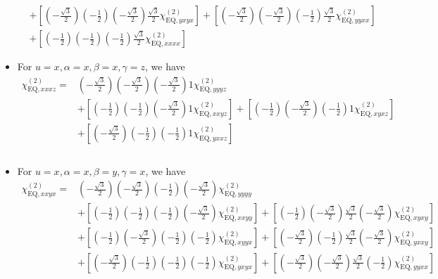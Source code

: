 \documentclass[UTF8,10pt,a4paper]{article}
\begin{document}
\begin{itemize}
\begin{align}
\nonumber&+\left[\left(-\frac{\sqrt{3}}{2}\right)\left(-\frac{1}{2}\right)\left(-\frac{\sqrt{3}}{2}\right)\frac{\sqrt{3}}{2}\chi_{\text{EQ},yxyx}^{(2)}\right]+\left[\left(-\frac{\sqrt{3}}{2}\right)\left(-\frac{\sqrt{3}}{2}\right)\left(-\frac{1}{2}\right)\frac{\sqrt{3}}{2}\chi_{\text{EQ},yyxx}^{(2)}\right]\\
&+\left[\left(-\frac{1}{2}\right)\left(-\frac{1}{2}\right)\left(-\frac{1}{2}\right)\frac{\sqrt{3}}{2}\chi_{\text{EQ},xxxx}^{(2)}\right]
\end{align}\normalsize
\item For $u=x,\alpha=x,\beta=x,\gamma=z$, we have
\footnotesize\begin{align}
\nonumber\chi_{\text{EQ},xxxz}^{(2)}=&\left(-\frac{\sqrt{3}}{2}\right)\left(-\frac{\sqrt{3}}{2}\right)\left(-\frac{\sqrt{3}}{2}\right)1\chi_{\text{EQ},yyyz}^{(2)}\\
\nonumber&+\left[\left(-\frac{1}{2}\right)\left(-\frac{1}{2}\right)\left(-\frac{\sqrt{3}}{2}\right)1\chi_{\text{EQ},xxyz}^{(2)}\right]+\left[\left(-\frac{1}{2}\right)\left(-\frac{\sqrt{3}}{2}\right)\left(-\frac{1}{2}\right)1\chi_{\text{EQ},xyxz}^{(2)}\right]\\
\nonumber&+\left[\left(-\frac{\sqrt{3}}{2}\right)\left(-\frac{1}{2}\right)\left(-\frac{1}{2}\right)1\chi_{\text{EQ},yxxz}^{(2)}\right]\\
\nonumber&\\
&
\end{align}\normalsize
\item For $u=x,\alpha=x,\beta=y,\gamma=x$, we have
\footnotesize\begin{align}
\nonumber\chi_{\text{EQ},xxyx}^{(2)}=&\left(-\frac{\sqrt{3}}{2}\right)\left(-\frac{\sqrt{3}}{2}\right)\left(-\frac{1}{2}\right)\left(-\frac{\sqrt{3}}{2}\right)\chi_{\text{EQ},yyyy}^{(2)}\\
\nonumber&+\left[\left(-\frac{1}{2}\right)\left(-\frac{1}{2}\right)\left(-\frac{1}{2}\right)\left(-\frac{\sqrt{3}}{2}\right)\chi_{\text{EQ},xxyy}^{(2)}\right]+\left[\left(-\frac{1}{2}\right)\left(-\frac{\sqrt{3}}{2}\right)\frac{\sqrt{3}}{2}\left(-\frac{\sqrt{3}}{2}\right)\chi_{\text{EQ},xyxy}^{(2)}\right]\\
\nonumber&+\left[\left(-\frac{1}{2}\right)\left(-\frac{\sqrt{3}}{2}\right)\left(-\frac{1}{2}\right)\left(-\frac{1}{2}\right)\chi_{\text{EQ},xyyx}^{(2)}\right]+\left[\left(-\frac{\sqrt{3}}{2}\right)\left(-\frac{1}{2}\right)\frac{\sqrt{3}}{2}\left(-\frac{\sqrt{3}}{2}\right)\chi_{\text{EQ},yxxy}^{(2)}\right]\\
\nonumber&+\left[\left(-\frac{\sqrt{3}}{2}\right)\left(-\frac{1}{2}\right)\left(-\frac{1}{2}\right)\left(-\frac{1}{2}\right)\chi_{\text{EQ},yxyx}^{(2)}\right]+\left[\left(-\frac{\sqrt{3}}{2}\right)\left(-\frac{\sqrt{3}}{2}\right)\frac{\sqrt{3}}{2}\left(-\frac{1}{2}\right)\chi_{\text{EQ},yyxx}^{(2)}\right]\\

\end{align}
\end{itemize}
\end{document}
